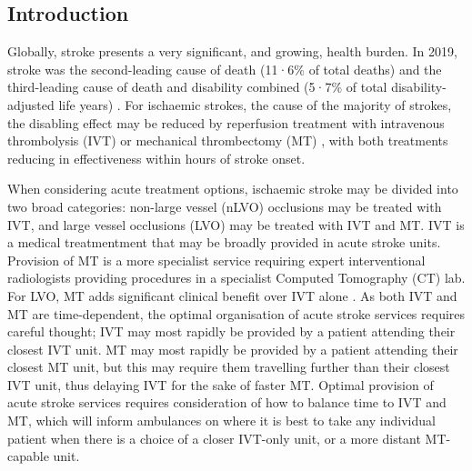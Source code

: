 \begin{multicols}{2}
\section{Introduction}




Globally, stroke presents a very significant, and growing, health burden. In 2019, stroke was the second-leading cause of death (11·6\% of total deaths) and the third-leading cause of death and disability combined (5·7\% of total disability-adjusted life years) \cite{feigin_global_2021}. For ischaemic strokes, the cause of the majority of strokes, the disabling effect may be reduced by reperfusion treatment with intravenous thrombolysis (IVT) \cite{emberson_effect_2014} or mechanical thrombectomy (MT) \cite{fransen_time_2016, goyal_endovascular_2016}, with both treatments reducing in effectiveness within hours of stroke onset.


When considering acute treatment options, ischaemic stroke may be divided into two broad categories: non-large vessel (nLVO) occlusions may be treated with IVT, and large vessel occlusions (LVO) may be treated with IVT and MT. IVT is a medical treatmentment that may be broadly provided in acute stroke units. Provision of MT is a more specialist service requiring expert interventional radiologists providing procedures in a specialist Computed Tomography (CT) lab. For LVO, MT adds significant clinical benefit over IVT alone \cite{fransen_time_2016, goyal_endovascular_2016}. As both IVT and MT are time-dependent, the optimal organisation of acute stroke services requires careful thought; IVT may most rapidly be provided by a patient attending their closest IVT unit. MT may most rapidly be provided by a patient attending their closest MT unit, but this may require them travelling further than their closest IVT unit, thus delaying IVT for the sake of faster MT. Optimal provision of acute stroke services requires consideration of how to balance time to IVT and MT, which will inform ambulances on where it is best to take any individual patient when there is a choice of a closer IVT-only unit, or a more distant MT-capable unit.


\end{multicols}
